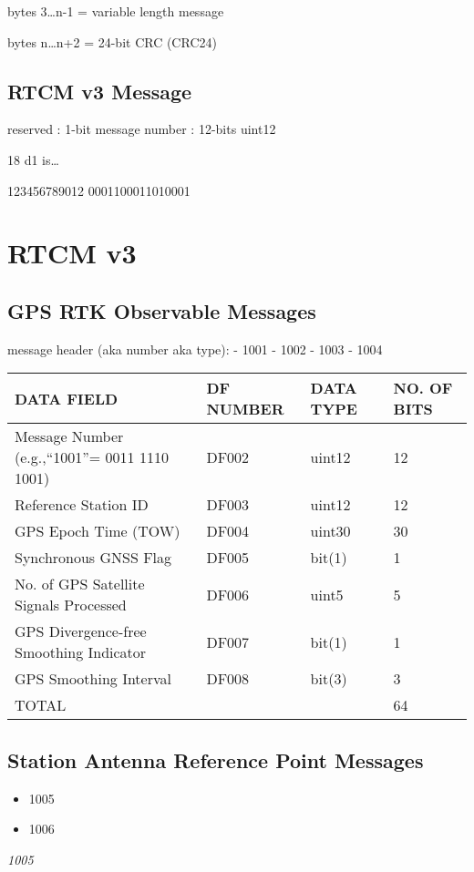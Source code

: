 bytes 3\ldots{}n-1 = variable length message

bytes n\ldots{}n+2 = 24-bit CRC (CRC24)

\subsection{RTCM v3 Message}\label{rtcm-v3-message}

reserved : 1-bit message number : 12-bits uint12

18 d1 is\ldots{}

123456789012 0001100011010001

\section{RTCM v3}\label{rtcm-v3-3}

\subsection{GPS RTK Observable
Messages}\label{gps-rtk-observable-messages}

message header (aka number aka type): - 1001 - 1002 - 1003 - 1004

\begin{longtable}[]{@{}llll@{}}
\toprule
DATA FIELD & DF NUMBER & DATA TYPE & NO. OF BITS\tabularnewline
\midrule
\endhead
Message Number (e.g.,``1001''= 0011 1110 1001) & DF002 & uint12 &
12\tabularnewline
Reference Station ID & DF003 & uint12 & 12\tabularnewline
GPS Epoch Time (TOW) & DF004 & uint30 & 30\tabularnewline
Synchronous GNSS Flag & DF005 & bit(1) & 1\tabularnewline
No. of GPS Satellite Signals Processed & DF006 & uint5 &
5\tabularnewline
GPS Divergence-free Smoothing Indicator & DF007 & bit(1) &
1\tabularnewline
GPS Smoothing Interval & DF008 & bit(3) & 3\tabularnewline
TOTAL & & & 64\tabularnewline
\bottomrule
\end{longtable}

\subsection{Station Antenna Reference Point
Messages}\label{station-antenna-reference-point-messages}

\begin{itemize}
\item
  1005
\item
  1006
\end{itemize}

{\emph{1005}}\label{section}

